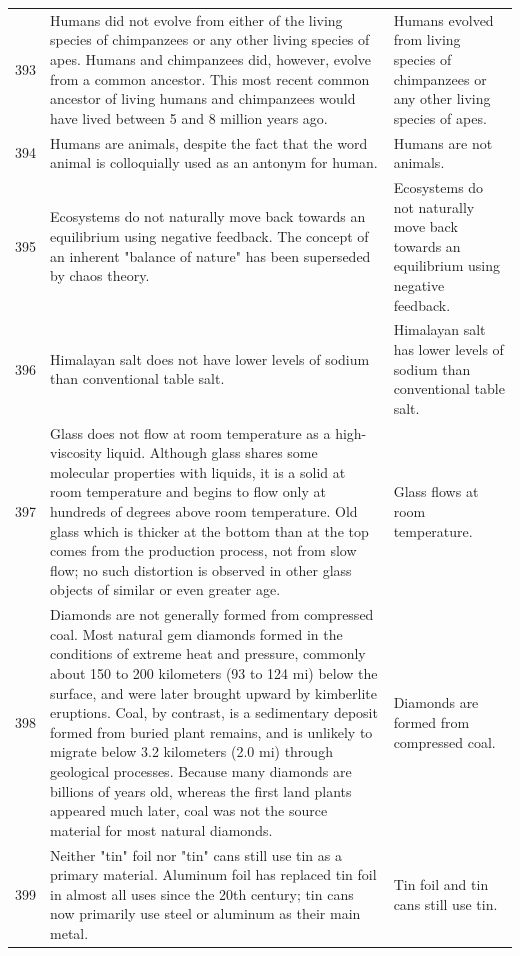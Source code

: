 \begin{tabular}{c|p{}|p{}}
393 & Humans did not evolve from either of the living species of chimpanzees or any other living species of apes. Humans and chimpanzees did, however, evolve from a common ancestor. This most recent common ancestor of living humans and chimpanzees would have lived between 5 and 8 million years ago. & Humans evolved from living species of chimpanzees or any other living species of apes. \\
394 & Humans are animals, despite the fact that the word animal is colloquially used as an antonym for human. & Humans are not animals. \\
395 & Ecosystems do not naturally move back towards an equilibrium using negative feedback. The concept of an inherent "balance of nature" has been superseded by chaos theory. & Ecosystems do not naturally move back towards an equilibrium using negative feedback. \\
396 & Himalayan salt does not have lower levels of sodium than conventional table salt. & Himalayan salt has lower levels of sodium than conventional table salt. \\
397 & Glass does not flow at room temperature as a high-viscosity liquid. Although glass shares some molecular properties with liquids, it is a solid at room temperature and begins to flow only at hundreds of degrees above room temperature. Old glass which is thicker at the bottom than at the top comes from the production process, not from slow flow; no such distortion is observed in other glass objects of similar or even greater age. & Glass flows at room temperature. \\
398 & Diamonds are not generally formed from compressed coal. Most natural gem diamonds formed in the conditions of extreme heat and pressure, commonly about 150 to 200 kilometers (93 to 124 mi) below the surface, and were later brought upward by kimberlite eruptions. Coal, by contrast, is a sedimentary deposit formed from buried plant remains, and is unlikely to migrate below 3.2 kilometers (2.0 mi) through geological processes. Because many diamonds are billions of years old, whereas the first land plants appeared much later, coal was not the source material for most natural diamonds. & Diamonds are formed from compressed coal. \\
399 & Neither "tin" foil nor "tin" cans still use tin as a primary material. Aluminum foil has replaced tin foil in almost all uses since the 20th century; tin cans now primarily use steel or aluminum as their main metal. & Tin foil and tin cans still use tin. \\

\end{tabular}
